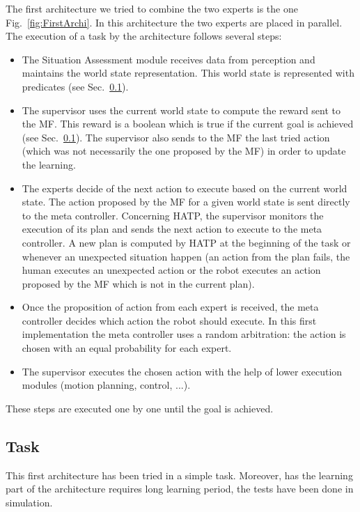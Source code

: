 \documentclass[english,a4paper,11pt,twoside]{StyleThese}
\begin{document}
The first architecture we tried to combine the two experts is the one Fig.~\ref{fig:FirstArchi}. In this architecture the two experts are placed in parallel. The execution of a task by the architecture follows several steps:
\begin{itemize}
\item The Situation Assessment module receives data from perception and maintains the world state representation. This world state is represented with predicates (see Sec.~\ref{subsec:taskOne}).
\item The supervisor uses the current world state to compute the reward sent to the MF. This reward is a boolean which is true if the current goal is achieved (see Sec.~\ref{subsec:taskOne}). The supervisor also sends to the MF the last tried action (which was not necessarily the one proposed by the MF) in order to update the learning.
\item The experts decide of the next action to execute based on the current world state. The action proposed by the MF for a given world state is sent directly to the meta controller. Concerning HATP, the supervisor monitors the execution of its plan and sends the next action to execute to the meta controller. A new plan is computed by HATP at the beginning of the task or whenever an unexpected situation happen (an action from the plan fails, the human executes an unexpected action or the robot executes an action proposed by the MF which is not in the current plan).
\item Once the proposition of action from each expert is received, the meta controller decides which action the robot should execute. In this first implementation the meta controller uses a random arbitration: the action is chosen with an equal probability for each expert.
\item The supervisor executes the chosen action with the help of lower execution modules (motion planning, control, ...). 
\end{itemize}
These steps are executed one by one until the goal is achieved.



\subsection{Task}

\label{subsec:taskOne}

This first architecture has been tried in a simple task. Moreover, has the learning part of the architecture requires long learning period, the tests have been done in simulation.
\end{document}
